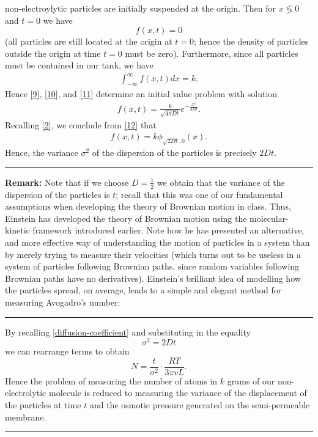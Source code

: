 \documentclass[12pt,reqno]{amsart}
\theoremstyle{plain}  %
\theoremstyle{definition}
\begin{document}
non-electroylytic particles are initially suspended at the origin. Then for $x
\lessgtr 0$ and $t=0$ we have
\begin{equation}
	\label{10}
	f(x,t) = 0
\end{equation}
(all particles are still located at the origin at $t=0$; hence the
density of particles outside the origin at time $t=0$ must be zero). Furthermore, since
all particles must be contained in our tank, we have
\begin{equation}
	\begin{split}
		\int_{-\infty}^{\infty} f(x,t) dx = k.
		\label{11}
	\end{split}
\end{equation}
Hence \eqref{9}, \eqref{10}, and \eqref{11} determine an initial value problem with 
solution
\begin{equation}
	\begin{split}
		f(x,t) = \frac{k}{\sqrt {4 \pi Dt}} e^{-\frac{x^2}{4Dt}}.
		\label{12}
	\end{split}
\end{equation}
Recalling \eqref{2}, we conclude from \eqref{12} that
\begin{equation}
	\begin{split}
		f(x,t)
		= k \phi_{\sqrt{2Dt}, 0}(x).
		\label{13}
	\end{split}
\end{equation}
Hence, the variance $\sigma^2$ of the dispersion of the particles is precisely
$2Dt$. 
\\
\hrule
{\bf Remark:} Note that if we choose $D=\frac{1}{2}$ we obtain that the variance of
the dispersion of the particles is $t$; recall that this was one of our fundamental
assumptions when developing the theory of Brownian motion in class. Thus, Einstein has
developed the theory of Brownian motion using the molecular-kinetic framework
introduced earlier. Note how he has presented an alternative, and more effective way
of understanding the motion of particles in a system than by merely trying to measure
their velocities (which turns out to be useless in a system of particles following
Brownian paths, since random variables following Brownian paths have no derivatives).
Einstein's brilliant idea of modelling how the particles spread, on average, leads to a
simple and elegant method for measuring Avogadro's number:
\\
\hrule
By recalling
\eqref{diffusion-coefficient} and substituting in the equality 
\begin{equation*}
	\sigma^2 = 2Dt
\end{equation*}
we can rearrange terms to obtain
\begin{equation}
	N = \frac{t}{\sigma^2} \cdot \frac{RT}{3 \pi v L}.
\end{equation}
Hence the problem of measuring the number of atoms in $k$ grams of our non-electrolytic
molecule is reduced to measuring the variance of the displacement of the particles at
time $t$ and the osmotic pressure generated on the semi-permeable membrane.
\\
\hrule









				  
\end{document}
